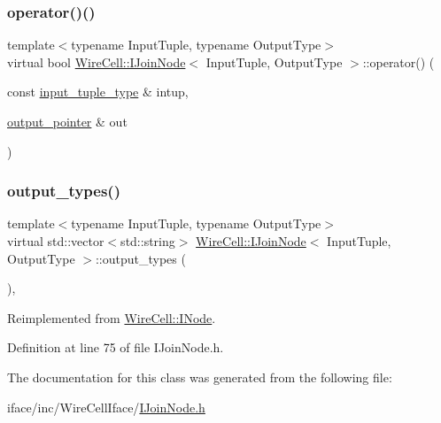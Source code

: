 \subsubsection{\texorpdfstring{operator()()}{operator()()}\hspace{0.1cm}{\footnotesize\ttfamily [2/2]}}
{\footnotesize\ttfamily template$<$typename Input\+Tuple, typename Output\+Type$>$ \\
virtual bool \hyperlink{class_wire_cell_1_1_i_join_node}{Wire\+Cell\+::\+I\+Join\+Node}$<$ Input\+Tuple, Output\+Type $>$\+::operator() (\begin{DoxyParamCaption}\item[{const \hyperlink{class_wire_cell_1_1_i_join_node_ae9ca74a75f29555ad20944d585f3b232}{input\+\_\+tuple\+\_\+type} \&}]{intup,  }\item[{\hyperlink{class_wire_cell_1_1_i_join_node_a7af33cc87415e15f0e7db2b083f3def7}{output\+\_\+pointer} \&}]{out }\end{DoxyParamCaption})\hspace{0.3cm}{\ttfamily [pure virtual]}}

\mbox{\label{class_wire_cell_1_1_i_join_node_abd32af32f2ed933356b4b3b7591cded3}} 
\subsubsection{\texorpdfstring{output\+\_\+types()}{output\_types()}}
{\footnotesize\ttfamily template$<$typename Input\+Tuple, typename Output\+Type$>$ \\
virtual std\+::vector$<$std\+::string$>$ \hyperlink{class_wire_cell_1_1_i_join_node}{Wire\+Cell\+::\+I\+Join\+Node}$<$ Input\+Tuple, Output\+Type $>$\+::output\+\_\+types (\begin{DoxyParamCaption}{ }\end{DoxyParamCaption})\hspace{0.3cm}{\ttfamily [inline]}, {\ttfamily [virtual]}}



Reimplemented from \hyperlink{class_wire_cell_1_1_i_node_aba7e537684cb4f2453796ff73da2d602}{Wire\+Cell\+::\+I\+Node}.



Definition at line 75 of file I\+Join\+Node.\+h.



The documentation for this class was generated from the following file\+:\begin{DoxyCompactItemize}
\item 
iface/inc/\+Wire\+Cell\+Iface/\hyperlink{_i_join_node_8h}{I\+Join\+Node.\+h}\end{DoxyCompactItemize}
